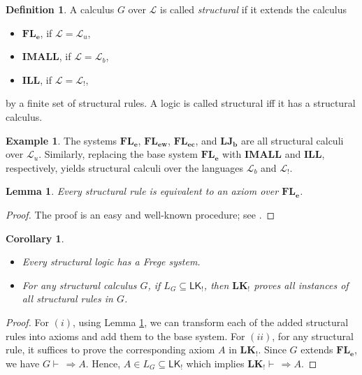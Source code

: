 \documentclass[12pt,a4paper]{article}
\theoremstyle{plain}
\newtheorem{lemma}[theorem]{Lemma}
\newtheorem{corollary}[theorem]{Corollary}
\theoremstyle{definition}
\newtheorem{definition}[theorem]{Definition}
\newtheorem{example}[theorem]{Example}
\newcommand{\LKajab}{\mathbf{LK_!}}
\newcommand{\LJb}{\mathbf{LJ_b}}
\begin{document}
\begin{definition}\label{def: structural calculus}
A calculus $G$ over $\mathcal{L}$ is called  \emph{structural} if it extends the calculus
\begin{itemize}
    \item 
$\mathbf{FL_e}$, if $\mathcal{L}=\mathcal{L}_u$,
    \item 
$\mathbf{IMALL}$, if $\mathcal{L}=\mathcal{L}_b$,
    \item 
$\mathbf{ILL}$, if $\mathcal{L}=\mathcal{L}_!$,
\end{itemize}
by a finite set of structural rules. A logic is called structural iff it has a structural calculus.
\end{definition}

\begin{example}
The systems $\mathbf{FL_e}$, $\mathbf{FL_{ew}}$, $\mathbf{FL_{ec}}$, and $\LJb$ are all structural calculi over $\mathcal{L}_u$. Similarly, replacing the base system $\mathbf{FL_e}$ with $\mathbf{IMALL}$ and $\mathbf{ILL}$, respectively, yields structural calculi over the languages $\mathcal{L}_b$ and $\mathcal{L}_!$.
\end{example}

\begin{lemma}\label{lem: RuleToAxiom}
Every structural rule is equivalent to an axiom over $\mathbf{FL_e}$.
\end{lemma}
\begin{proof}
The proof is an easy and well-known procedure; see \cite[Theorem 4.2]{ciabattoni2008axioms}.
\end{proof}

\begin{corollary}\label{Cor: ExistenceOfFrege}
\begin{itemize}
    \item[$(i)$] 
Every structural logic has a Frege system.
    \item[$(ii)$] 
For any structural calculus $G$, if $L_G \subseteq \mathsf{LK_!}$, then $\mathbf{LK}_!$ proves all instances of all structural rules in $G$.   
\end{itemize}
\end{corollary}
\begin{proof}
For $(i)$, using Lemma \ref{lem: RuleToAxiom}, we can transform each of the added structural rules into axioms and add them to the base system. For $(ii)$, for any structural rule, it suffices to prove the corresponding axiom $A$ in $\LKajab$. Since $G$ extends $\mathbf{FL_e}$, we have $G \vdash \, \Rightarrow A$. Hence, $A \in L_G \subseteq \mathsf{LK_!}$ which implies $\LKajab \vdash \, \Rightarrow A$.
\end{proof}
\end{document}

